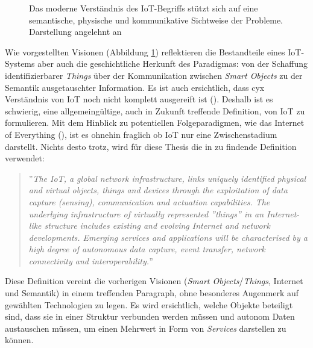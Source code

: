\begin{figure}
    \centering
    \caption{Das moderne Verständnis des \ac{IoT}-Begriffs stützt sich auf eine semantische, physische und kommunikative Sichtweise der Probleme. Darstellung angelehnt an \cite{atzori2010internet}}
    \label{fig:visions}
\end{figure}


Wie vorgestellten Visionen (Abbildung \ref{fig:visions}) reflektieren die Bestandteile eines \ac{IoT}-Systems aber auch die geschichtliche Herkunft des Paradigmas: von der Schaffung identifizierbarer \textit{Things} über der Kommunikation zwischen \textit{Smart Objects} zu der Semantik ausgetauschter Information. Es ist auch ersichtlich, dass cyx Verständnis von \ac{IoT} noch nicht komplett ausgereift ist (\cite{atzori2010internet}). Deshalb ist es schwierig, eine allgemeingültige, auch in Zukunft treffende Definition, von \ac{IoT} zu formulieren. Mit dem Hinblick zu potentiellen Folgeparadigmen, wie das Internet of Everything (\cite{Snyder2017}), ist es ohnehin fraglich ob \ac{IoT} nur eine Zwischenstadium darstellt. Nichts desto trotz, wird für diese Thesis die in \cite{Misra2017} zu findende Definition verwendet: 
\begin{quote}
   ''\textit{The \ac{IoT}, a global network infrastructure, links uniquely identified physical and virtual objects, things and devices through the exploitation of data capture (sensing), communication and actuation capabilities. The underlying infrastructure of virtually represented ''things'' in an Internet-like structure includes existing and evolving Internet and network developments. Emerging services and applications will be characterised by a high degree of autonomous data capture, event transfer, network connectivity and interoperability.}''
\end{quote}

Diese Definition vereint die vorherigen Visionen (\textit{Smart Objects}/\textit{Things}, Internet und Semantik) in einem treffenden Paragraph, ohne besonderes Augenmerk auf gewählten Technologien zu legen. Es wird ersichtlich, welche Objekte beteiligt sind, dass sie in einer Struktur verbunden werden müssen und autonom Daten austauschen müssen, um einen Mehrwert in Form von \textit{Services} darstellen zu können. 


